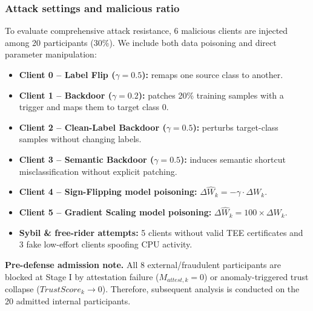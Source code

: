 \documentclass[runningheads]{llncs}
\begin{document}
\subsubsection{Attack settings and malicious ratio}
To evaluate comprehensive attack resistance, 6 malicious clients are injected among 20 participants (30\%). We include both data poisoning and direct parameter manipulation:
\begin{itemize}
    \item \textbf{Client 0 -- Label Flip ($\gamma=0.5$):} remaps one source class to another.
    \item \textbf{Client 1 -- Backdoor ($\gamma=0.2$):} patches 20\% training samples with a trigger and maps them to target class $0$.
    \item \textbf{Client 2 -- Clean-Label Backdoor ($\gamma=0.5$):} perturbs target-class samples without changing labels.
    \item \textbf{Client 3 -- Semantic Backdoor ($\gamma=0.5$):} induces semantic shortcut misclassification without explicit patching.
    \item \textbf{Client 4 -- Sign-Flipping model poisoning:} $\Delta \widehat{W}_k = - \gamma \cdot \Delta W_k$.
    \item \textbf{Client 5 -- Gradient Scaling model poisoning:} $\Delta \widehat{W}_k = 100 \times \Delta W_k$.
    \item \textbf{Sybil \& free-rider attempts:} 5 clients without valid TEE certificates and 3 fake low-effort clients spoofing CPU activity.
\end{itemize}

\textbf{Pre-defense admission note.} All 8 external/fraudulent participants are blocked at Stage I by attestation failure ($M_{attest,k}=0$) or anomaly-triggered trust collapse ($TrustScore_k \to 0$). Therefore, subsequent analysis is conducted on the 20 admitted internal participants.
\end{document}
